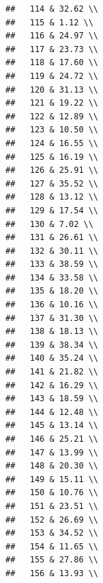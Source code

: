 \documentclass{article}\usepackage[]{graphicx}\usepackage[]{color}
\makeatletter
\newenvironment{kframe}{%
 \def\at@end@of@kframe{}%
 \ifinner\ifhmode%
  \def\at@end@of@kframe{\end{minipage}}%
  \begin{minipage}{\columnwidth}%
 \fi\fi%
 \def\FrameCommand##1{\hskip\@totalleftmargin \hskip-\fboxsep
 \colorbox{shadecolor}{##1}\hskip-\fboxsep
     \hskip-\linewidth \hskip-\@totalleftmargin \hskip\columnwidth}%
 \MakeFramed {\advance\hsize-\width
   \@totalleftmargin\z@ \linewidth\hsize
   \@setminipage}}%
 {\par\unskip\endMakeFramed%
 \at@end@of@kframe}
\newenvironment{knitrout}{}{} %
\makeatother
\begin{document}
\begin{knitrout}
\begin{kframe}
\begin{verbatim}
##   114 & 32.62 \\ 
##   115 & 1.12 \\ 
##   116 & 24.97 \\ 
##   117 & 23.73 \\ 
##   118 & 17.60 \\ 
##   119 & 24.72 \\ 
##   120 & 31.13 \\ 
##   121 & 19.22 \\ 
##   122 & 12.89 \\ 
##   123 & 10.50 \\ 
##   124 & 16.55 \\ 
##   125 & 16.19 \\ 
##   126 & 25.91 \\ 
##   127 & 35.52 \\ 
##   128 & 13.12 \\ 
##   129 & 17.54 \\ 
##   130 & 7.02 \\ 
##   131 & 26.61 \\ 
##   132 & 30.11 \\ 
##   133 & 38.59 \\ 
##   134 & 33.58 \\ 
##   135 & 18.20 \\ 
##   136 & 10.16 \\ 
##   137 & 31.30 \\ 
##   138 & 18.13 \\ 
##   139 & 38.34 \\ 
##   140 & 35.24 \\ 
##   141 & 21.82 \\ 
##   142 & 16.29 \\ 
##   143 & 18.59 \\ 
##   144 & 12.48 \\ 
##   145 & 13.14 \\ 
##   146 & 25.21 \\ 
##   147 & 13.99 \\ 
##   148 & 20.30 \\ 
##   149 & 15.11 \\ 
##   150 & 10.76 \\ 
##   151 & 23.51 \\ 
##   152 & 26.69 \\ 
##   153 & 34.52 \\ 
##   154 & 11.65 \\ 
##   155 & 27.86 \\ 
##   156 & 13.93 \\ 

\end{verbatim}
\end{kframe}
\end{knitrout}
\end{document}
